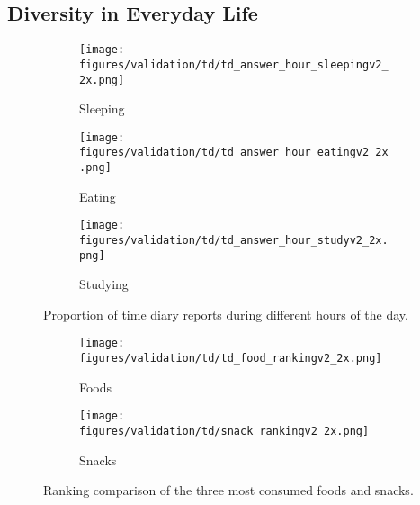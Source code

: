 \subsection{Diversity in Everyday Life}

\begin{figure}
    \centering
    \begin{subfigure}[b]{0.33\textwidth}
    \texttt{[image: figures/validation/td/td\_answer\_hour\_sleepingv2\_2x.png]}
    \caption{Sleeping}
    \label{fig:val:td:disthours:sleeping}
    \end{subfigure}
    \begin{subfigure}[b]{0.33\textwidth}
    \texttt{[image: figures/validation/td/td\_answer\_hour\_eatingv2\_2x.png]}
    \caption{Eating}
    \label{fig:val:td:disthours:eating}
    \end{subfigure}
    \begin{subfigure}[b]{0.33\textwidth}
    \texttt{[image: figures/validation/td/td\_answer\_hour\_studyv2\_2x.png]}
    \caption{Studying}
    \label{fig:val:td:disthours:studying}
    \end{subfigure}
    \caption{Proportion of time diary reports during different hours of the day.}
    \label{fig:val:td:disthours}
\end{figure}

\begin{figure}
    \centering
    \begin{subfigure}{0.49\textwidth}
        \texttt{[image: figures/validation/td/td\_food\_rankingv2\_2x.png]}
        \caption{Foods}
        \label{fig:val:td:food:food}
    \end{subfigure}
    \begin{subfigure}{0.49\textwidth}
        \texttt{[image: figures/validation/td/snack\_rankingv2\_2x.png]}
        \caption{Snacks}
        \label{fig:val:td:food:snack}
    \end{subfigure}
    \caption{Ranking comparison of the three most consumed foods and snacks.}
    \label{fig:val:td:food}
\end{figure}

